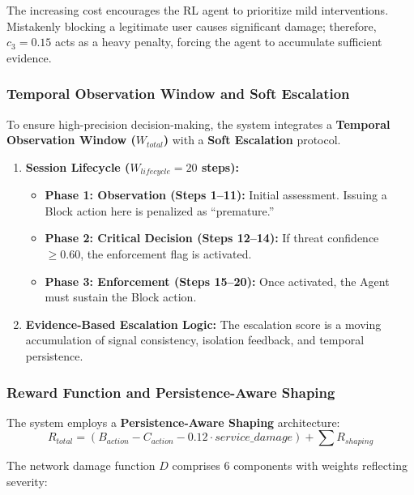 \documentclass[12pt,a4paper]{report}
\begin{document}
The increasing cost encourages the RL agent to prioritize mild interventions. Mistakenly blocking a legitimate user causes significant damage; therefore, $c_3 = 0.15$ acts as a heavy penalty, forcing the agent to accumulate sufficient evidence.

\subsubsection{Temporal Observation Window and Soft Escalation}

To ensure high-precision decision-making, the system integrates a \textbf{Temporal Observation Window ($W_{total}$)} with a \textbf{Soft Escalation} protocol.

\begin{enumerate}
    \item \textbf{Session Lifecycle ($W_{lifecycle} = 20$ steps):}
    \begin{itemize}
        \item \textbf{Phase 1: Observation (Steps 1–11):} Initial assessment. Issuing a Block action here is penalized as ``premature.''
        \item \textbf{Phase 2: Critical Decision (Steps 12–14):} If threat confidence $\ge 0.60$, the enforcement flag is activated.
        \item \textbf{Phase 3: Enforcement (Steps 15–20):} Once activated, the Agent must sustain the Block action.
    \end{itemize}
    \item \textbf{Evidence-Based Escalation Logic:} The escalation score is a moving accumulation of signal consistency, isolation feedback, and temporal persistence.
\end{enumerate}

\subsubsection{Reward Function and Persistence-Aware Shaping}

The system employs a \textbf{Persistence-Aware Shaping} architecture:
\begin{equation}
R_{total} = (B_{action} - C_{action} - 0.12 \cdot service\_damage) + \sum R_{shaping}
\end{equation}

The network damage function $D$ comprises 6 components with weights reflecting severity:
\end{document}
